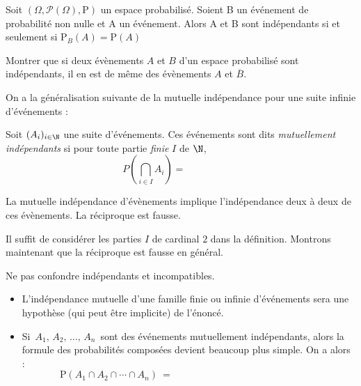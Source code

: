 \documentclass[french,11pt,twoside]{VcCours}
\renewcommand{\P}{\text{P}}
\begin{document}
\begin{Proposition}{}
Soit $(\Omega,\mathcal{P}(\Omega),\P)$ un espace probabilisé. Soient B un événement de probabilité non nulle et A un événement. Alors A et B sont indépendants si et seulement si $\P_B(A)=\P(A)$
\end{Proposition}

\begin{Demonstration}{}

\vspace{4cm}
\end{Demonstration}

\begin{ApplicationDirecte}{} Montrer que si deux évènements $A$ et $B$ d'un espace probabilisé sont indépendants, il en est de même des évènements $A$ et $\overline{B}$.
\end{ApplicationDirecte}



 
On a la généralisation suivante de la mutuelle indépendance pour une suite infinie d'événements :

\begin{Definition}{}
 Soit $(A_i)_{i \in \N}$ une suite d'événements. Ces événements sont dits \emph{mutuellement indépendants} si  pour toute partie \emph{finie} $I$ de $\N$,
$$ P\left(\bigcap_{i \in I} A_i \right) = \phantom{\prod_{i\in I} P(A_i).}$$
\end{Definition}

\begin{Proposition}{} La mutuelle indépendance d'évènements implique l'indépendance deux à deux de ces évènements. La réciproque est fausse.
\end{Proposition}

\begin{Demonstration}{} Il suffit de considérer les parties $I$ de cardinal $2$ dans la définition. Montrons maintenant que la réciproque est fausse en général. 

\vspace{5cm}
\end{Demonstration}

\begin{Remarque}[\alerte]{}
 Ne pas confondre indépendants et incompatibles.
\end{Remarque}


\begin{Remarques}{}
\begin{itemize}
 \item L'indépendance mutuelle d'une famille finie ou infinie d'événements sera une hypothèse (qui peut être implicite) de l'énoncé.
 \item Si $\,A_1,\,A_2,\,\dots,\,A_n\,$ sont des événements mutuellement indépendants, 
alors la formule des probabilités composées devient beaucoup plus simple. On a alors : 
$$ \P(A_1\cap A_2\cap \cdots\cap A_{n})\ = \phantom{ \P(A_1)\times \P(A_2)\times\cdots\times \P(A_{n})}$$
\end{itemize}
\end{Remarques}{}
\end{document}
